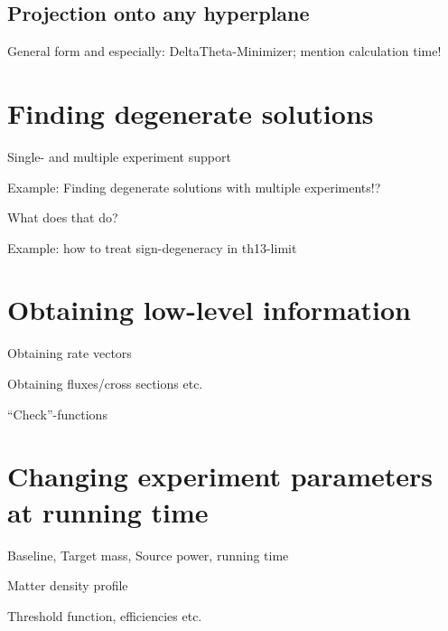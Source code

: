 \section[Projection onto any hyperplane]{Projection onto any  hyperplane}

General form and especially: DeltaTheta-Minimizer; mention calculation time!

\chapter{Finding degenerate solutions}

\bi
\item
 Single- and multiple experiment support
\item 
Example: Finding degenerate solutions with multiple experiments!?
\item
 What does that do?
\item
 Example: how to treat sign-degeneracy in th13-limit
\ei

\chapter{Obtaining low-level information}

\bi
\item
 Obtaining rate vectors
\item
 Obtaining fluxes/cross sections etc.
\item
 ``Check''-functions
\ei

\chapter{Changing experiment parameters at running time}

\bi
\item
 Baseline, Target mass, Source power, running time
\item
 Matter density profile
\item
 Threshold function, efficiencies etc.
\ei